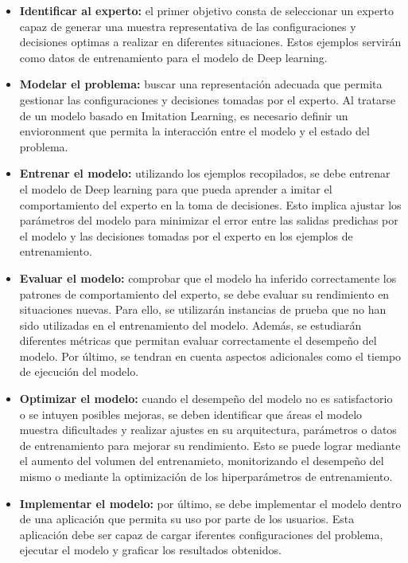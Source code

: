 \begin{itemize}
\item \textbf{Identificar al experto:} el primer objetivo consta de seleccionar un
experto capaz de generar una muestra representativa de las configuraciones y decisiones 
optimas a realizar en diferentes situaciones. Estos ejemplos servirán como datos 
de entrenamiento para el modelo de Deep learning.
\item \textbf{Modelar el problema:} buscar una representación adecuada que permita gestionar 
las configuraciones y decisiones tomadas por el experto. Al tratarse de un modelo basado en 
Imitation Learning, es necesario definir un envioronment que permita la interacción entre el 
modelo y el estado del problema.
\item \textbf{Entrenar el modelo:} utilizando los ejemplos recopilados, se debe entrenar 
el modelo de Deep learning para que pueda aprender a imitar el comportamiento 
del experto en la toma de decisiones. Esto implica ajustar los parámetros del modelo para 
minimizar el error entre las salidas predichas por el modelo y las decisiones tomadas por 
el experto en los ejemplos de entrenamiento.
\item \textbf{Evaluar el modelo:} comprobar que el modelo ha inferido correctamente
los patrones de comportamiento del experto, se debe evaluar su rendimiento en situaciones
nuevas. Para ello, se utilizarán instancias de prueba que no han sido utilizadas en el
entrenamiento del modelo. Además, se estudiarán diferentes métricas que permitan evaluar 
correctamente el desempeño del modelo. Por último, se tendran en cuenta aspectos adicionales 
como el tiempo de ejecución del modelo.
\item \textbf{Optimizar el modelo:} cuando el desempeño del modelo no es satisfactorio o 
se intuyen posibles mejoras, se deben identificar que áreas el modelo muestra dificultades y realizar ajustes 
en su arquitectura, parámetros o datos de entrenamiento para mejorar su rendimiento. Esto 
se puede lograr mediante el aumento del volumen del entrenamieto, monitorizando el desempeño
del mismo o mediante la optimización de los hiperparámetros de entrenamiento.
\item \textbf{Implementar el modelo:} por último, se debe implementar el modelo dentro de
una aplicación que permita su uso por parte de los usuarios. Esta aplicación debe ser capaz
de cargar iferentes configuraciones del problema, ejecutar el modelo y graficar los resultados
obtenidos.
\end{itemize}


